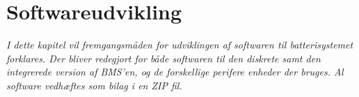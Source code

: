 \chapter{Softwareudvikling}\label{kap:softwareudvikling}

\emph{I dette kapitel vil fremgangsmåden for udviklingen af softwaren til batterisystemet forklares. Der bliver redegjort for både softwaren til den diskrete samt den integrerede version af BMS'en, og de forskellige perifere enheder der bruges. Al software vedhæftes som bilag i en ZIP fil.}